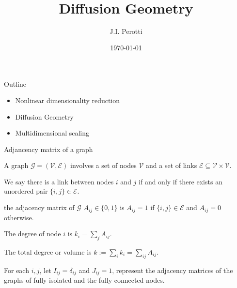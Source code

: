 \documentclass{beamer}
\title[]{Diffusion Geometry}
\author{J.I. Perotti}
\institute{IFEG-CONICET, FaMAF-UNC}
\date{\today}
\begin{document}

\begin{frame}
  \titlepage
\end{frame}



\begin{frame}{Outline}

\begin{itemize}
\item Nonlinear dimensionality reduction
\item Diffusion Geometry
\item Multidimensional scaling
\end{itemize}

\end{frame}


\begin{frame}{Adjancency matrix of a graph}

A graph $\mathcal{G}=(\mathcal{V},\mathcal{E})$ involves a set of nodes $\mathcal{V}$ and a set of links $\mathcal{E} \subseteq \mathcal{V}\times \mathcal{V}$.
\vspace{.25cm}

We say there is a link between nodes $i$ and $j$ if and only if there exists an unordered pair $\{i,j\} \in \mathcal{E}$.

\vspace{.25cm}

the adjacency matrix of $\mathcal{G}$ $A_{ij} \in \{0,1\}$ is $A_{ij}=1$ if $\{i,j\}\in \mathcal{E}$ and $A_{ij}=0$ otherwise.

\vspace{.25cm}

The degree of node $i$ is $k_i=\sum_j A_{ij}$.

\vspace{.25cm}

The total degree or volume is $k:=\sum_i k_i = \sum_{ij} A_{ij}$.

\vspace{.25cm}

For each $i,j$, let $I_{ij} = \delta_{ij}$ and
$J_{ij} = 1$, represent the adjacency matrices of the graphs of fully isolated and the fully connected nodes.

\end{frame}
\end{document}
